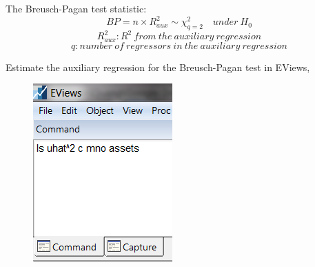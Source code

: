 \documentclass[12pt]{report}
\begin{document}
\noindent The Breusch-Pagan test statistic:
$$BP =  n\times R^2_{aux} \sim \chi_{q=2}^2 \quad under\ H_0$$ $$R^2_{aux}: R^2\ from\ the\ auxiliary\ regression$$ $$q:number\ of\ regressors\ in\ the\ auxiliary\ regression$$

\noindent Estimate the auxiliary regression for the Breusch-Pagan test in EViews,
\begin{figure}[H]
	\centering
	\includegraphics{tute10_1}
\end{figure}
\vspace{-\baselineskip}
\end{document}
